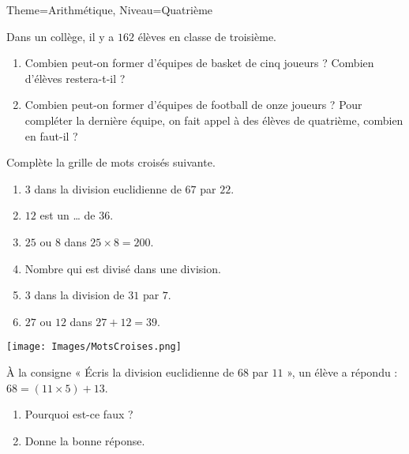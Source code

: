 \documentclass[11pt]{article}
\begin{document}
\begin{multicols}{2}

\begin{Maquette}[Fiche]{Theme=Arithmétique, Niveau=Quatrième}

\begin{exercice}
    Dans un collège, il y a $162$ élèves en classe de troisième.
    \begin{enumerate}
        \item Combien peut-on former d’équipes de basket de cinq joueurs ? Combien d’élèves restera-t-il ? 
        \item Combien peut-on former d’équipes de football de onze joueurs ? Pour compléter la dernière équipe, on fait appel à des élèves de quatrième, combien en faut-il ?
    \end{enumerate}
\end{exercice}

\begin{exercice}
    Complète la grille de mots croisés suivante.
    \begin{enumerate}
        \item $3$ dans la division euclidienne de $67$ par $22$.
        \item $12$ est un … de $36$.
        \item $25$ ou $8$ dans $25 \times 8 = 200$.
        \item Nombre qui est divisé dans une division.
        \item $3$ dans la division de $31$ par $7$.
        \item $27$ ou $12$ dans $27 + 12 = 39$.
    \end{enumerate}
    \texttt{[image: Images/MotsCroises.png]}

\end{exercice}

\begin{exercice}
    À la consigne « Écris la division euclidienne de $68$ par $11$ », un élève a répondu : $68 = (11 \times 5) + 13$.
    \begin{enumerate}
        \item Pourquoi est-ce faux ?
        \item Donne la bonne réponse.
    \end{enumerate}
\end{exercice}

\columnbreak 


\end{Maquette}
\end{multicols}
\end{document}
